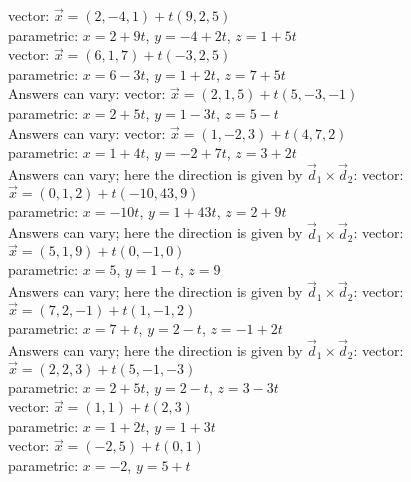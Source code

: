 \begin{Answer}
\Question vector: $\vec x = (2,-4,1) + t(9,2,5)$\\
parametric: $x= 2+9t$, $y=-4+2t$, $z = 1+5t$\\
\Question vector: $\vec x = (6,1,7) + t(-3,2,5)$\\
parametric: $x= 6-3t$, $y=1+2t$, $z = 7+5t$\\
\Question Answers can vary:
vector: $\vec x = (2,1,5) + t(5,-3,-1)$\\
parametric: $x= 2+5t$, $y=1-3t$, $z = 5-t$\\
\Question Answers can vary:
vector: $\vec x = (1,-2,3) + t(4,7,2)$\\
parametric: $x= 1+4t$, $y=-2+7t$, $z = 3+2t$\\
\Question Answers can vary; here the direction is given by $\vec d_1\times \vec d_2$:
vector: $\vec x = (0,1,2) + t(-10,43,9)$\\
parametric: $x= -10t$, $y=1+43t$, $z = 2+9t$\\
\Question Answers can vary; here the direction is given by $\vec d_1\times \vec d_2$:
vector: $\vec x = (5,1,9) + t(0,-1,0)$\\
parametric: $x= 5$, $y=1-t$, $z = 9$\\
\Question Answers can vary; here the direction is given by $\vec d_1\times \vec d_2$:
vector: $\vec x = (7,2,-1) + t(1,-1,2)$\\
parametric: $x= 7+t$, $y=2-t$, $z = -1+2t$\\
\Question Answers can vary; here the direction is given by $\vec d_1\times \vec d_2$:
vector: $\vec x = (2,2,3) + t(5,-1,-3)$\\
parametric: $x= 2+5t$, $y=2-t$, $z = 3-3t$\\
\Question vector: $\vec x = (1,1) + t(2,3)$\\
parametric: $x= 1+2t$, $y=1+3t$\\
\Question vector: $\vec x = (-2,5) + t(0,1)$\\
parametric: $x= -2$, $y=5+t$\\

\end{Answer}
